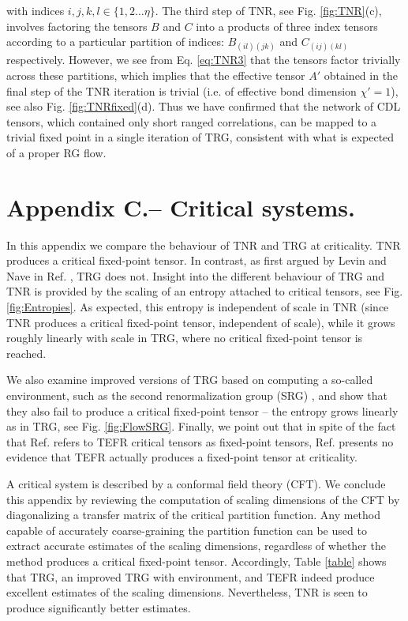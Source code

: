 \documentclass[aps,prl,twocolumn,showpacs,superscriptaddress,floatfix,10pt]{revtex4-1}
\begin{document}
with indices $i,j,k,l \in \{1,2\ldots\eta\}$. The third step of TNR, see Fig. \ref{fig:TNR}(c),
involves factoring the tensors $B$ and $C$ into a products of three index tensors according to a particular partition of indices: $B_{(il)(jk)}$ and $C_{(ij)(kl)}$ respectively. However, we see from Eq. \ref{eq:TNR3} that the tensors factor trivially across these partitions, which implies that the effective tensor $A'$ obtained in the final step of the TNR iteration is trivial (i.e. of effective bond dimension $\chi' = 1$), see also Fig. \ref{fig:TNRfixed}(d). Thus we have confirmed that the network of CDL tensors, which contained only short ranged correlations, can be mapped to a trivial fixed point in a single iteration of TRG, consistent with what is expected of a proper RG flow.


\section{Appendix C.-- Critical systems.}

In this appendix we compare the behaviour of TNR and TRG at criticality. 
TNR produces a critical fixed-point tensor. In contrast, as first argued by Levin and Nave in Ref. \cite{TRG}, TRG does not. Insight into the different behaviour of TRG and TNR is provided by the scaling of an entropy attached to critical tensors, see Fig. \ref{fig:Entropies}. As expected, this entropy is independent of scale in TNR (since TNR produces a critical fixed-point tensor, independent of scale), while it grows roughly linearly with scale in TRG, where no critical fixed-point tensor is reached. 

We also examine improved versions of TRG based on computing a so-called environment, such as the second renormalization group (SRG) \cite{TRGenv,SRG,HOTRG}, and show that they also fail to produce a critical fixed-point tensor -- the entropy grows linearly as in TRG, see Fig. \ref{fig:FlowSRG}. Finally, we point out that in spite of the fact that Ref. \cite{TEFR} refers to TEFR critical tensors as fixed-point tensors, Ref. \cite{TEFR} presents no evidence that TEFR actually produces a fixed-point tensor at criticality.

A critical system is described by a conformal field theory (CFT). We conclude this appendix by reviewing the computation of scaling dimensions of the CFT by diagonalizing a transfer matrix of the critical partition function. Any method capable of accurately coarse-graining the partition function can be used to extract accurate estimates of the scaling dimensions, regardless of whether the method produces a critical fixed-point tensor. Accordingly, Table \ref{table} shows that TRG, an improved TRG with environment, and TEFR indeed produce excellent estimates of the scaling dimensions. Nevertheless, TNR is seen to produce significantly better estimates.
\end{document}

